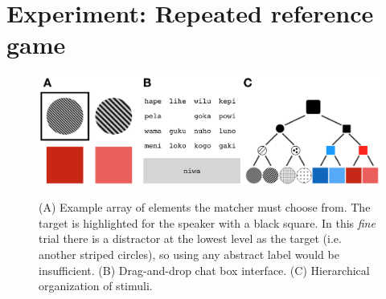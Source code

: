 \documentclass[10pt,letterpaper]{article}
\begin{document}



			
\section{Experiment: Repeated reference game}

\begin{figure}[t]
\begin{center}
{\includegraphics[scale=.65]{fig.png}}
{\caption{{(A) Example array of elements the matcher must choose from. The target is highlighted for the speaker with a black square. In this \emph{fine} trial there is a distractor at the lowest level as the target (i.e. another striped circles), so using any abstract label would be insufficient. (B) Drag-and-drop chat box interface. (C) Hierarchical organization of stimuli.\label{exp}}}}
\end{center}
\end{figure}
\end{document}

